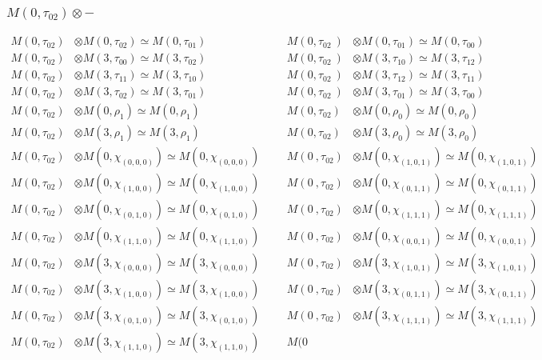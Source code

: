 \subsubsection{$M(0,\tau_{02})\otimes -$}
\begin{align*}
M(0,\tau_{02}) &\otimes M(0,\tau_{02}) \simeq M(0,\tau_{01}) &&& M(0,\tau_{02}\
) &\otimes M(0,\tau_{01}) \simeq M(0,\tau_{00})\\
M(0,\tau_{02}) &\otimes M(3,\tau_{00}) \simeq M(3,\tau_{02}) &&& M(0,\tau_{02}\
) &\otimes M(3,\tau_{10}) \simeq M(3,\tau_{12})\\
M(0,\tau_{02}) &\otimes M(3,\tau_{11}) \simeq M(3,\tau_{10}) &&& M(0,\tau_{02}\
) &\otimes M(3,\tau_{12}) \simeq M(3,\tau_{11})\\
M(0,\tau_{02}) &\otimes M(3,\tau_{02}) \simeq M(3,\tau_{01}) &&& M(0,\tau_{02}\
) &\otimes M(3,\tau_{01}) \simeq M(3,\tau_{00})\\
M(0,\tau_{02}) &\otimes M(0,\rho_{1}) \simeq M(0,\rho_{1}) &&& M(0,\tau_{02}) \
&\otimes M(0,\rho_{0}) \simeq M(0,\rho_{0})\\
M(0,\tau_{02}) &\otimes M(3,\rho_{1}) \simeq M(3,\rho_{1}) &&& M(0,\tau_{02}) \
&\otimes M(3,\rho_{0}) \simeq M(3,\rho_{0})\\
M(0,\tau_{02}) &\otimes M(0,\chi_{(0,0,0)}) \simeq M(0,\chi_{(0,0,0)}) &&& M(0\
,\tau_{02}) &\otimes M(0,\chi_{(1,0,1)}) \simeq M(0,\chi_{(1,0,1)})\\
M(0,\tau_{02}) &\otimes M(0,\chi_{(1,0,0)}) \simeq M(0,\chi_{(1,0,0)}) &&& M(0\
,\tau_{02}) &\otimes M(0,\chi_{(0,1,1)}) \simeq M(0,\chi_{(0,1,1)})\\
M(0,\tau_{02}) &\otimes M(0,\chi_{(0,1,0)}) \simeq M(0,\chi_{(0,1,0)}) &&& M(0\
,\tau_{02}) &\otimes M(0,\chi_{(1,1,1)}) \simeq M(0,\chi_{(1,1,1)})\\
M(0,\tau_{02}) &\otimes M(0,\chi_{(1,1,0)}) \simeq M(0,\chi_{(1,1,0)}) &&& M(0\
,\tau_{02}) &\otimes M(0,\chi_{(0,0,1)}) \simeq M(0,\chi_{(0,0,1)})\\
M(0,\tau_{02}) &\otimes M(3,\chi_{(0,0,0)}) \simeq M(3,\chi_{(0,0,0)}) &&& M(0\
,\tau_{02}) &\otimes M(3,\chi_{(1,0,1)}) \simeq M(3,\chi_{(1,0,1)})\\
M(0,\tau_{02}) &\otimes M(3,\chi_{(1,0,0)}) \simeq M(3,\chi_{(1,0,0)}) &&& M(0\
,\tau_{02}) &\otimes M(3,\chi_{(0,1,1)}) \simeq M(3,\chi_{(0,1,1)})\\
M(0,\tau_{02}) &\otimes M(3,\chi_{(0,1,0)}) \simeq M(3,\chi_{(0,1,0)}) &&& M(0\
,\tau_{02}) &\otimes M(3,\chi_{(1,1,1)}) \simeq M(3,\chi_{(1,1,1)})\\
M(0,\tau_{02}) &\otimes M(3,\chi_{(1,1,0)}) \simeq M(3,\chi_{(1,1,0)}) &&& M(0\

\end{align*}

